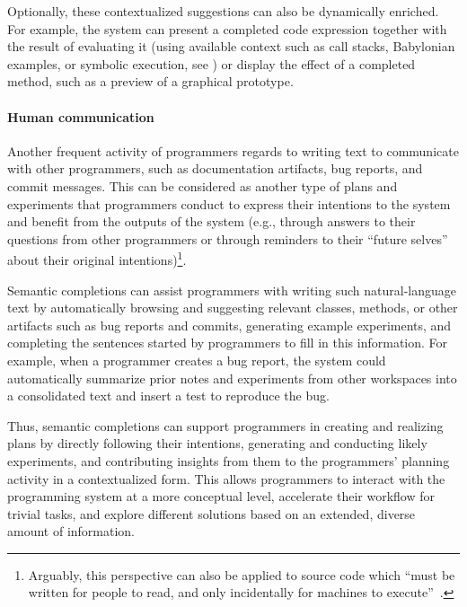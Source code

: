 Optionally, these contextualized suggestions can also be dynamically enriched.
For example, the system can present a completed code expression together with the result of evaluating it (using available context such as call stacks, Babylonian examples, or symbolic execution, see %
%
) or display the effect of a completed method, such as a preview of a graphical prototype.

\paragraph{Human communication}
Another frequent activity of programmers regards to writing text to communicate with other programmers, such as documentation artifacts, bug reports, and commit messages.
This can be considered as another type of plans and experiments that programmers conduct to express their intentions to the system and benefit from the outputs of the system (e.g., through answers to their questions from other programmers or through reminders to their ``future selves'' about their original intentions)\footnote{Arguably, this perspective can also be applied to source code which ``must be written for people to read,
and only incidentally for machines to execute''~\cite[p.~xxii]{abelson1996structure}.}.

Semantic completions can assist programmers with writing such natural-language text by automatically browsing and suggesting relevant classes, methods, or other artifacts such as bug reports and commits, generating example experiments, and completing the sentences started by programmers to fill in this information.
For example, when a programmer creates a bug report, the system could automatically summarize prior notes and experiments from other workspaces into a consolidated text and insert a test to reproduce the bug.

\ParSep

Thus, semantic completions can support programmers in creating and realizing plans by directly following their intentions, generating and conducting likely experiments, and contributing insights from them to the programmers' planning activity in a contextualized form.
This allows programmers to interact with the programming system at a more conceptual level, accelerate their workflow for trivial tasks, and explore different solutions based on an extended, diverse amount of information.

